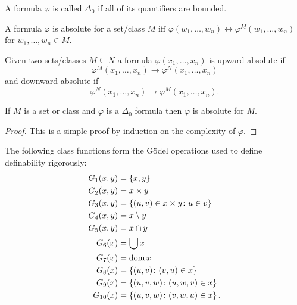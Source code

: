 \begin{definition}
    A formula \(\varphi\) is called \(\Delta_{0}\) if all of its quantifiers are
    bounded.
\end{definition}

\begin{definition}
    A formula \(\varphi\) is absolute for a set/class \(M\) iff
    \(\varphi(w_{1},\ldots,w_{n})\leftrightarrow\varphi^{M}(w_{1},\ldots,w_{n})\)
    for \(w_{1},\ldots,w_{n}\in M\).

    Given two sets/classes \(M\subseteq N\) a formula
    \(\varphi(x_{1},\ldots,x_{n})\) is upward absolute if
    \[
        \varphi^{M}(x_{1},\ldots,x_{n})\to\varphi^{N}(x_{1},\ldots,x_{n})
    \]
    and downward absolute if
    \[
        \varphi^{N}(x_{1},\ldots,x_{n})\to\varphi^{M}(x_{1},\ldots,x_{n}).
    \]
\end{definition}

\begin{proposition}
    If \(M\) is a set or class and \(\varphi\) is a \(\Delta_{0}\) formula then
    \(\varphi\) is absolute for \(M\).

    \begin{proof}
        This is a simple proof by induction on the complexity of \(\varphi\).
    \end{proof}
\end{proposition}

\begin{definition}
    The following class functions form the Gödel operations used to define
    definability rigorously:
    \begin{align*}
        G_{1}(x,y) & =\left\{x,y\right\}                            \\
        G_{2}(x,y) & =x\times y                            \\
        G_{3}(x,y) & =\left\{(u,v)\in x\times y\colon u\in v\right\} \\
        G_{4}(x,y) & =x\setminus y                         \\
        G_{5}(x,y) & =x\cap y                              \\
        G_{6}(x)   & =\bigcup x                            \\
        G_{7}(x)   & =\operatorname{dom} x                               \\
        G_{8}(x)   & =\left\{(u,v)\colon(v,u)\in x\right\}          \\
        G_{9}(x)   & =\left\{(u,v,w)\colon(u,w,v)\in x\right\}      \\
        G_{10}(x)  & =\left\{(u,v,w)\colon(v,w,u)\in x\right\}.
    \end{align*}
\end{definition}

